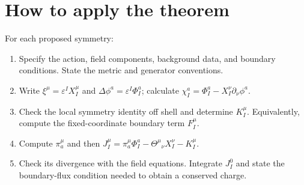 \documentclass[11pt]{article}
\newcommand{\Th}{\Theta}
\begin{document}
\section{How to apply the theorem}
For each proposed symmetry:
\begin{enumerate}
\item Specify the action, field components, background data, and boundary
conditions. State the metric and generator conventions.
\item Write \(\xi^\mu=\varepsilon^I X_I^\mu\) and
\(\Delta\phi^a=\varepsilon^I\Phi_I^a\); calculate
\(\chi_I^a=\Phi_I^a-X_I^\nu\partial_\nu\phi^a\).
\item Check the local symmetry identity off shell and determine \(K_I^\mu\).
Equivalently, compute the fixed-coordinate boundary term \(F_I^\mu\).
\item Compute \(\pi_a^\mu\) and then
\(J_I^\mu=\pi_a^\mu\Phi_I^a-\Th^\mu{}_{\nu}X_I^\nu-K_I^\mu\).
\item Check its divergence with the field equations. Integrate \(J_I^0\)
and state the boundary-flux condition needed to obtain a conserved charge.
\end{enumerate}
\end{document}
